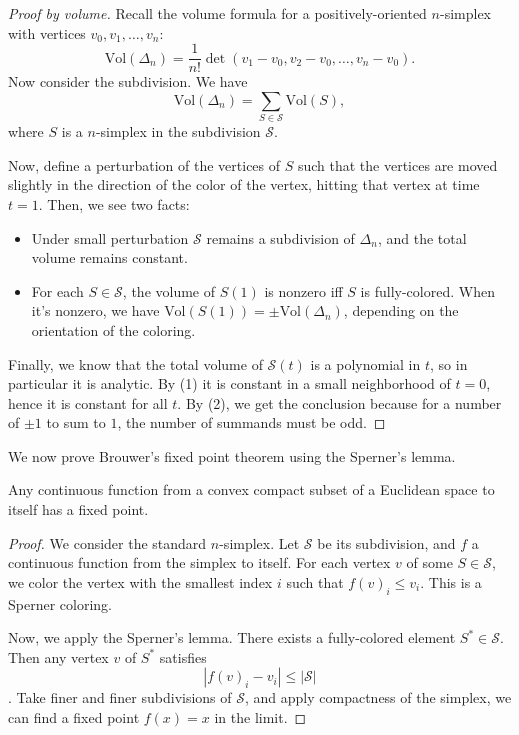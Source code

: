 \begin{proof}[Proof by volume]
    Recall the volume formula for a positively-oriented $n$-simplex with vertices $v_0, v_1, \ldots, v_n$:
    \[
    \text{Vol}(\Delta_n) = \frac{1}{n!} \det(v_1 - v_0, v_2 - v_0, \ldots, v_n - v_0).
    \]
    Now consider the subdivision. We have
    \[
    \text{Vol}(\Delta_n) = \sum_{S \in \mathcal{S}} \text{Vol}(S),
    \]
    where $S$ is a $n$-simplex in the subdivision $\mathcal{S}$.

    Now, define a perturbation of the vertices of $S$ such that the vertices are moved slightly in the direction of the color of the vertex, hitting that vertex at time $t = 1$. Then, we see two facts:
    \begin{itemize}
        \item Under small perturbation $\mathcal{S}$ remains a subdivision of $\Delta_n$, and the total volume remains constant.
        \item For each $S \in \mathcal{S}$, the volume of $S(1)$ is nonzero iff $S$ is fully-colored. When it's nonzero, we have $\text{Vol}(S(1)) = \pm \text{Vol}(\Delta_n)$, depending on the orientation of the coloring.
    \end{itemize}
    Finally, we know that the total volume of $\mathcal{S}(t)$ is a polynomial in $t$, so in particular it is analytic. By (1) it is constant in a small neighborhood of $t = 0$, hence it is constant for all $t$. By (2), we get the conclusion because for a number of $\pm 1$ to sum to $1$, the number of summands must be odd.
\end{proof}

We now prove Brouwer's fixed point theorem using the Sperner's lemma.
\begin{theorem}
    Any continuous function from a convex compact subset of a Euclidean space to itself has a fixed point.
\end{theorem}
\begin{proof}
    We consider the standard $n$-simplex. Let $\mathcal{S}$ be its subdivision, and $f$ a continuous function from the simplex to itself. For each vertex $v$ of some $S \in \mathcal{S}$, we color the vertex with the smallest index $i$ such that $f(v)_i \leq v_i$. This is a Sperner coloring.

    Now, we apply the Sperner's lemma. There exists a fully-colored element $S^* \in \mathcal{S}$. Then any vertex $v$ of $S^*$ satisfies
    \[
    |f(v)_i - v_i| \leq |\mathcal{S}|
    \].
    Take finer and finer subdivisions of $\mathcal{S}$, and apply compactness of the simplex, we can find a fixed point $f(x) = x$ in the limit.
\end{proof}

